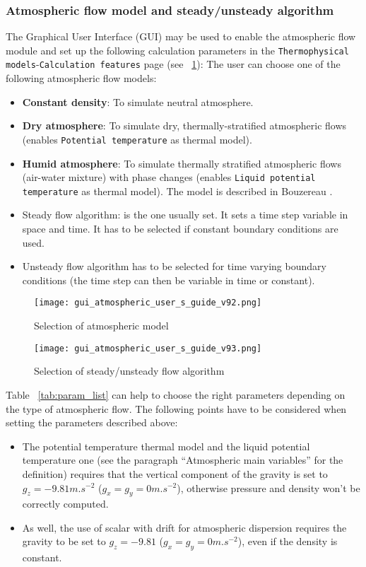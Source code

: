{{\subsubsection{Atmospheric flow model and steady/unsteady algorithm}
%
The Graphical User Interface (GUI) may be used to enable the atmospheric flow
module and set up the following calculation parameters in the
\texttt{Thermophysical models}-\texttt{Calculation features} page
(see \figurename~\ref{fig:steady}):
%
%
The user can choose one of the following atmospheric flow models:
%
\begin{itemize}
\item \textbf{Constant density}: To simulate neutral atmosphere.
\item \textbf{Dry atmosphere}: To simulate dry, thermally-stratified
atmospheric flows (enables \texttt{Potential temperature} as thermal model).
\item \textbf{Humid atmosphere}: To simulate thermally stratified atmospheric
flows (air-water mixture) with phase changes (enables \texttt{Liquid potential
temperature} as thermal model). The model is described in
Bouzereau \cite{bouzereau}.
\end{itemize}
%
%
\begin{itemize}
\item Steady flow algorithm: is the one usually set. It sets a time step
variable in space and time. It has to be selected if constant boundary
conditions are used.
\item Unsteady flow algorithm has to be selected for time varying boundary
conditions (the time step can then be variable in time or constant).
\end{itemize}
%
\begin{figure}[ht]
\centerline{\texttt{[image: gui\_atmospheric\_user\_s\_guide\_v92.png]}}
\caption{Selection of atmospheric model}
\label{fig:steady}
\end{figure}
%
\begin{figure}[ht]
\centerline{\texttt{[image: gui\_atmospheric\_user\_s\_guide\_v93.png]}}
\caption{Selection of steady/unsteady flow algorithm}
\label{fig:global}
\end{figure}
%
Table \tablename~\ref{tab:param_list} can help to choose the right parameters
depending on the type of atmospheric flow.
%
The following points have to be considered when setting the parameters
described above:
\begin{itemize}
\item The potential temperature thermal model and the liquid potential
temperature one (see the paragraph ``Atmospheric main variables'' for the
definition) requires that the vertical component of the gravity is set to
$g_z=-9.81 m.s^{-2}$ ($g_x=g_y=0 m.s^{-2}$),
otherwise pressure and density won't be correctly computed.
\item As well, the use of scalar with drift for atmospheric dispersion requires
the gravity to be set to $g_z=-9.81$ ($g_x=g_y=0 m.s^{-2}$), even if the density
is constant.
\end{itemize}
%
}}

